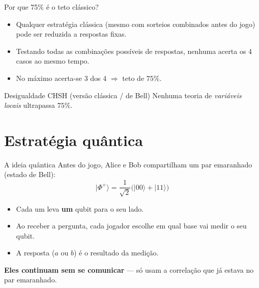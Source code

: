 \documentclass[aspectratio=169]{beamer}
\begin{document}
{\begin{frame}{Por que 75\% é o teto clássico?}
  \begin{itemize}
    \item Qualquer estratégia clássica (mesmo com sorteios combinados
          antes do jogo) pode ser reduzida a respostas fixas.
    \item Testando todas as combinações possíveis de respostas, \alert{nenhuma}
          acerta os 4 casos ao mesmo tempo.
    \item No máximo acerta-se 3 dos 4 $\Rightarrow$ teto de $75\%$.
  \end{itemize}
  \begin{block}{Desigualdade CHSH (versão clássica / de Bell)}
    Nenhuma teoria de \emph{variáveis locais} ultrapassa $75\%$.
  \end{block}
\end{frame}

\section{Estratégia quântica}

\begin{frame}{A ideia quântica}
  Antes do jogo, Alice e Bob compartilham um par emaranhado
  (estado de Bell):
  \[
    \lvert \Phi^{+} \rangle = \frac{1}{\sqrt{2}}\big(\lvert 00 \rangle + \lvert 11 \rangle\big)
  \]
  \begin{itemize}
    \item Cada um leva \textbf{um} qubit para o seu lado.
    \item Ao receber a pergunta, cada jogador escolhe em qual
          \alert{base} vai medir o seu qubit.
    \item A resposta ($a$ ou $b$) é o resultado da medição.
  \end{itemize}
  \textbf{Eles continuam sem se comunicar} — só usam a correlação que
  já estava no par emaranhado.
\end{frame}


}
\end{document}
